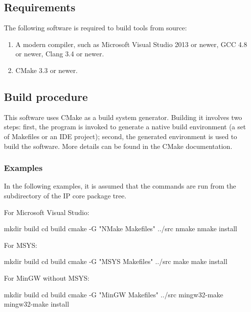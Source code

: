 \documentclass[a4paper,12pt,twoside,extrafontsizes]{memoir}
\begin{document}
\subsection{Requirements}

The following software is required to build \lxp{} tools from source:

\begin{enumerate}
	\item A modern \cplusplus{} compiler, such as Microsoft\textregistered{} Visual Studio\textregistered{} 2013 or newer, GCC 4.8 or newer, Clang 3.4 or newer.
	\item CMake 3.3 or newer.
\end{enumerate}

\subsection{Build procedure}

This software uses CMake as a build system generator. Building it involves two steps: first, the  program is invoked to generate a native build environment (a set of Makefiles or an IDE project); second, the generated environment is used to build the software. More details can be found in the CMake documentation.

\subsubsection{Examples}

In the following examples, it is assumed that the commands are run from the  subdirectory of the \lxp{} IP core package tree.

For Microsoft\textregistered{} Visual Studio\textregistered{}:

\begin{codepar}
    mkdir build
    cd build
    cmake -G "NMake Makefiles" ../src
    nmake
    nmake install
\end{codepar}

For MSYS:

\begin{codepar}
    mkdir build
    cd build
    cmake -G "MSYS Makefiles" ../src
    make
    make install
\end{codepar}

For MinGW without MSYS:

\begin{codepar}
    mkdir build
    cd build
    cmake -G "MinGW Makefiles" ../src
    mingw32-make
    mingw32-make install
\end{codepar}
\end{document}
